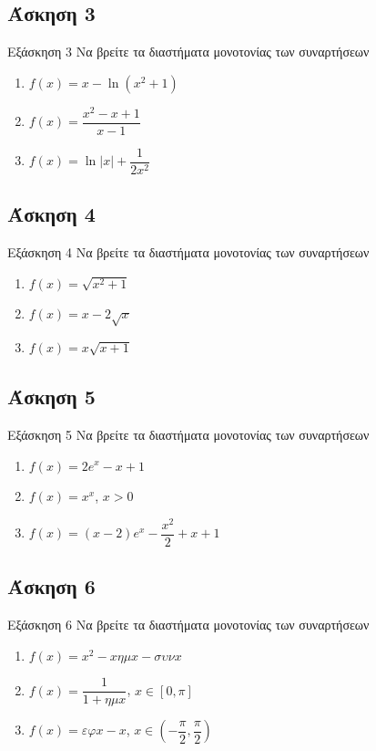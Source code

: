 \documentclass[greek]{beamer}
\begin{document}
\subsection{Άσκηση 3}
\begin{frame}[label=Άσκηση3]{Εξάσκηση 3}
 Να βρείτε τα διαστήματα μονοτονίας των συναρτήσεων
 \begin{enumerate}
  \item<1-> $f(x)=x-\ln (x^2+1)$
  \item<2-> $f(x)=\dfrac{x^2-x+1}{x-1}$
  \item<3-> $f(x)=\ln |x|+\dfrac{1}{2x^2}$
 \end{enumerate}

\end{frame}

\subsection{Άσκηση 4}
\begin{frame}[label=Άσκηση4]{Εξάσκηση 4}
 Να βρείτε τα διαστήματα μονοτονίας των συναρτήσεων
 \begin{enumerate}
  \item<1-> $f(x)=\sqrt{x^2+1}$
  \item<2-> $f(x)=x-2\sqrt{x}$
  \item<3-> $f(x)=x\sqrt{x+1}$
 \end{enumerate}

\end{frame}

\subsection{Άσκηση 5}
\begin{frame}[label=Άσκηση5]{Εξάσκηση 5}
 Να βρείτε τα διαστήματα μονοτονίας των συναρτήσεων
 \begin{enumerate}
  \item<1-> $f(x)=2e^x-x+1$
  \item<2-> $f(x)=x^x$, $x>0$
  \item<3-> $f(x)=(x-2)e^x-\dfrac{x^2}{2}+x+1$
 \end{enumerate}

\end{frame}

\subsection{Άσκηση 6}
\begin{frame}[label=Άσκηση6]{Εξάσκηση 6}
 Να βρείτε τα διαστήματα μονοτονίας των συναρτήσεων
 \begin{enumerate}
  \item<1-> $f(x)=x^2-xημx-συνx$
  \item<2-> $f(x)=\dfrac{1}{1+ημx}$, $x\in [0,\pi]$
  \item<3-> $f(x)=εφx-x$, $x\in \left( -\dfrac{\pi}{2},\dfrac{\pi}{2} \right) $
 \end{enumerate}

\end{frame}
\end{document}
